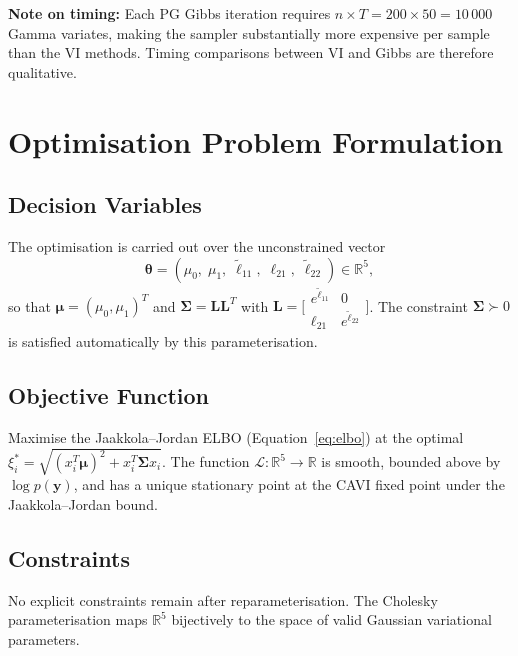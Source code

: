 \documentclass[11pt,a4paper]{article}
\newcommand{\R}{\mathbb{R}}
\begin{document}
\textbf{Note on timing:}
Each PG Gibbs iteration requires $n \times T = 200 \times 50 = 10\,000$ Gamma variates,
making the sampler substantially more expensive per sample than the VI methods.
Timing comparisons between VI and Gibbs are therefore qualitative.

\section{Optimisation Problem Formulation}

\subsection*{Decision Variables}

The optimisation is carried out over the unconstrained vector
\begin{equation}
  \bm{\theta} = (\mu_0,\; \mu_1,\; \tilde{\ell}_{11},\; \ell_{21},\; \tilde{\ell}_{22})
  \in \R^5,
\end{equation}
so that $\bm{\mu} = (\mu_0, \mu_1)^T$ and
$\bm{\Sigma} = \bm{L}\bm{L}^T$ with $\bm{L} = \bigl[\begin{smallmatrix}
e^{\tilde{\ell}_{11}} & 0 \\ \ell_{21} & e^{\tilde{\ell}_{22}} \end{smallmatrix}\bigr]$.
The constraint $\bm{\Sigma} \succ 0$ is satisfied automatically by this parameterisation.

\subsection*{Objective Function}

Maximise the Jaakkola--Jordan ELBO (Equation~\ref{eq:elbo}) at the optimal
$\xi_i^* = \sqrt{(x_i^T\bm{\mu})^2 + x_i^T\bm{\Sigma} x_i}$.
The function $\mathcal{L}: \R^5 \to \R$ is smooth, bounded above by $\log p(\bm{y})$,
and has a unique stationary point at the CAVI fixed point under the Jaakkola--Jordan bound.

\subsection*{Constraints}

No explicit constraints remain after reparameterisation.
The Cholesky parameterisation maps $\R^5$ bijectively to the space of
valid Gaussian variational parameters.
\end{document}
